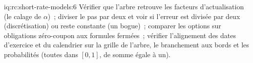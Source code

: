 \begin{solution}{iq:rc:short-rate-models:6}
Vérifier que l'arbre retrouve les facteurs d'actualisation (le calage de $\alpha$)~; diviser le pas par deux et voir
si l'erreur est divisée par deux (discrétisation) ou reste constante (un bogue)~; comparer les options sur obligations zéro-coupon
aux formules fermées~; vérifier l'alignement des dates d'exercice et du calendrier
sur la grille de l'arbre, le branchement aux bords et les probabilités (toutes dans
$[0,1]$, de somme égale à un).
\end{solution}
